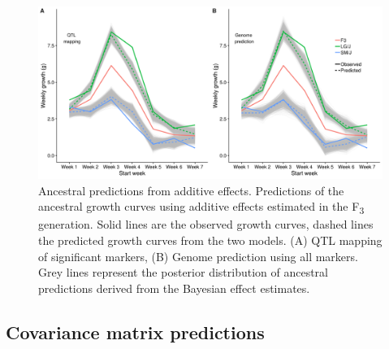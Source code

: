 \begin{refsection}
\begin{figure}
\includegraphics[width=\linewidth]{chapter_JoH-Melo_etal/media/growth_LG_SM_F3_predictions.png}
\caption[Ancestral predictions from additive effects]{Ancestral predictions from additive effects.
Predictions of the ancestral growth curves using additive effects
estimated in the F\textsubscript{3} generation. Solid lines are the
observed growth curves, dashed lines the predicted growth curves from
the two models. (A) QTL mapping of significant markers, (B) Genome
prediction using all markers. Grey lines represent the posterior
distribution of ancestral predictions derived from the Bayesian effect
estimates.}
\end{figure}

\subsection{Covariance matrix predictions}


\end{refsection}
